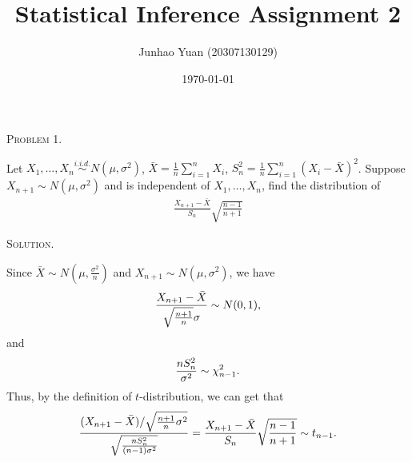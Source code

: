 \documentclass{article}
\title{\textbf{Statistical Inference Assignment 2}}
\author{Junhao Yuan (20307130129)}
\date{\today}
\begin{document}
\begin{CJK}{UTF8}{gbsn}

    \maketitle

    \newtheorem{lemma}{Lemma}[]

    \begin{shaded}
        \noindent\textsc{Problem 1.}\par
        Let $X_1, \ldots, X_n \mathop{\sim}\limits^{i.i.d.} N(\mu, \sigma^2)$, $\bar{X} = \frac{1}{n}\sum_{i=1}^nX_i$,
        $S_n^2=\frac{1}{n} \sum_{i=1}^n (X_i-\bar{X})^2$. Suppose $X_{n+1}\sim N(\mu, \sigma^2)$ and is independent of
        $X_1, \ldots, X_n$, find the distribution of
        \begin{align}
            \frac{X_{n+1}-\bar{X}}{S_n}\sqrt{\frac{n-1}{n+1}}
        \end{align}
    \end{shaded}
    \noindent\textsc{Solution.}\par
    Since $\bar{X}\sim N(\mu,\frac{\sigma^2}{n})$ and $X_{n+1}\sim N(\mu,\sigma^2)$, we have
    \begin{align}
        \frac{X_{n+1}-\bar{X}}{\sqrt{\frac{n+1}{n}}\sigma} \sim N(0,1),\notag
    \end{align}
    and
    \begin{align}
        \frac{nS_n^2}{\sigma^2}\sim \chi_{n-1}^2.\notag
    \end{align}
    Thus, by the definition of $t$-distribution, we can get that
    \begin{align}
        \frac{(X_{n+1}-\bar{X})/\sqrt{\frac{n+1}{n}\sigma^2}}{\sqrt{\frac{nS_n^2}{(n-1)\sigma^2}}}
        = \frac{X_{n+1}-\bar{X}}{S_n}\sqrt{\frac{n-1}{n+1}} \sim t_{n-1}.\notag
    \end{align}




\end{CJK}
\end{document}
